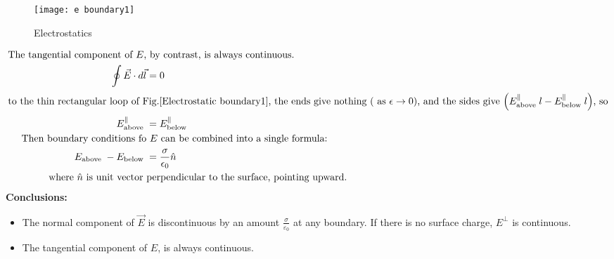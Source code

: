 \begin{wrapfigure}{r}{0.25\textwidth}
	\begin{center}
		\texttt{[image: e boundary1]}
	\end{center}
	\caption{Electrostatics}
	\label{Electrostatics boundary 2}
\end{wrapfigure}
\begin{align*}
\text{The tangential component of $E$,}&\text{ by contrast, is always continuous.}\\
\oint \vec{E} \cdot d \vec{l}&=0\\
\intertext{to the thin rectangular loop of Fig.\ref{Electrostatic boundary1}, the ends give nothing $($ as $\epsilon \rightarrow 0)$, and the sides give $\left(E_{\text {above }}^{\|} l-E_{\text {below }}^{\|} l\right)$, so}
{E}_{\text {above }}^{\|}&={E}_{\text {below }}^{\|}\\
\text{Then boundary conditions fo}&\text{ $E$ can be combined into a single formula:}\\
{E}_{\text {above }}-{E}_{\text {below }}&=\frac{\sigma}{\epsilon_{0}} \hat{{n}}\\
\text{where $\hat{n}$ is unit vector }&\text{perpendicular to the surface, pointing upward.}
\end{align*}
\textbf{Conclusions:} 
\begin{itemize}
	\item The normal component of $\vec{E}$ is discontinuous by an amount $\frac{\sigma}{\varepsilon_{0}}$ at any boundary. If there is no surface charge, $E^{\perp}$ is continuous.
	\item The tangential component of $E$,  is always continuous.
\end{itemize}

